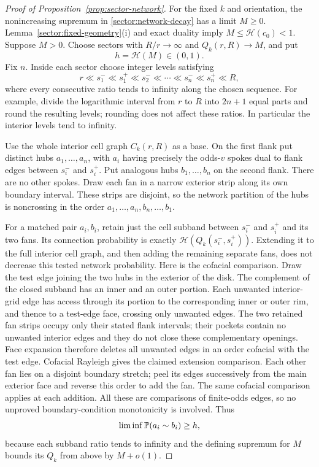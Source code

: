 \begin{proof}[Proof of Proposition~\ref{prop:sector-network}]
For the fixed $k$ and orientation, the nonincreasing supremum in
\eqref{sector:network-decay} has a limit $M\geq0$.
Lemma~\ref{sector:fixed-geometry}(i) and exact duality imply
$M\leq\mathcal H(c_0)<1$.  Suppose $M>0$.  Choose sectors with
$R/r\to\infty$ and $Q_k(r,R)\to M$, and put
\[
 h=\mathcal H(M)\in(0,1).
\]
Fix $n$.  Inside each sector choose integer levels satisfying
\begin{equation}\label{sector:separated-levels}
 r\ll s_1^-\ll s_1^+\ll s_2^-\ll\cdots
       \ll s_n^-\ll s_n^+\ll R,
\end{equation}
where every consecutive ratio tends to infinity along the chosen
sequence.  For example, divide the logarithmic interval from $r$ to
$R$ into $2n+1$ equal parts and round the resulting levels; rounding
does not affect these ratios.  In particular the interior levels
tend to infinity.

Use the whole interior cell graph $C_k(r,R)$ as a base.  On the first
flank put distinct hubs $a_1,\ldots,a_n$, with $a_i$ having precisely
the odds-$v$ spokes dual to flank edges between $s_i^-$ and $s_i^+$.
Put analogous hubs $b_1,\ldots,b_n$ on the second flank.  There are
no other spokes.  Draw each fan in a narrow exterior strip along its
own boundary interval.  These strips are disjoint, so the network
partition of the hubs is noncrossing in the order
$a_1,\ldots,a_n,b_n,\ldots,b_1$.

For a matched pair $a_i,b_i$, retain just the cell subband between
$s_i^-$ and $s_i^+$ and its two fans.  Its connection probability is
exactly $\mathcal H(Q_k(s_i^-,s_i^+))$.  Extending it to the full
interior cell graph, and then adding the remaining separate fans,
does not decrease this tested network probability.  Here is the
cofacial comparison.  Draw the test edge joining the two hubs in the
exterior of the disk.  The complement of the closed subband has an
inner and an outer portion.  Each unwanted interior-grid edge has
access through its portion to the corresponding inner or outer rim,
and thence to a test-edge face, crossing only unwanted edges.  The
two retained fan strips occupy only their stated flank intervals;
their pockets contain no unwanted interior edges and they do not
close these complementary openings.  Face expansion therefore
deletes all unwanted edges in an order cofacial with the test edge.
Cofacial Rayleigh gives the claimed extension comparison.  Each
other fan lies on a disjoint boundary stretch; peel its edges
successively from the main exterior face and reverse this order to
add the fan.  The same cofacial comparison applies at each addition.
All these are comparisons of finite-odds edges, so no unproved
boundary-condition monotonicity is involved.  Thus
\begin{equation}\label{sector:matched-lower}
 \liminf\mathbb P(a_i\sim b_i)\geq h,
\end{equation}
because each subband ratio tends to infinity and the defining
supremum for $M$ bounds its $Q_k$ from above by $M+o(1)$.


\end{proof}
